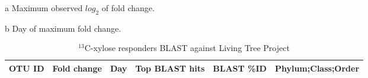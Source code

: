 \thispagestyle{empty}

\begin{ThreePartTable}
\begin{TableNotes}
\item[a] Maximum observed $log_{2}$ of fold change. 
\item[b] Day of maximum fold change.
\end{TableNotes}

\begin{longtable}{lrrP{5cm}rP{5cm}}

\caption{$^{13}$C-xylose responders BLAST against Living Tree Project}\label{tab:xyl} \\
\toprule 
    \textbf{OTU ID} & 
    \textbf{Fold change}  & 
    \textbf{Day}  & 
    \textbf{Top BLAST hits} & 
    \textbf{BLAST \%ID} & 
    \textbf{Phylum;Class;Order} \\
\midrule
\endfirsthead


\end{longtable}
\end{ThreePartTable}
